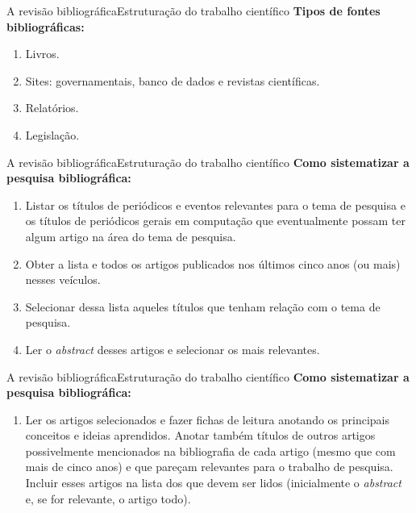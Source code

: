 \documentclass[t]{beamer}
\begin{document}

\begin{ftst}{A revisão bibliográfica}{Estruturação do trabalho científico}
\justifying
\textbf{Tipos de fontes bibliográficas:}
\vone
\begin{enumerate}
    \item Livros.
    \item Sites: governamentais, banco de dados e revistas científicas.
    \item Relatórios.
    \item Legislação.
\end{enumerate}


\end{ftst}


\begin{ftst}{A revisão bibliográfica}{Estruturação do trabalho científico}
\justifying
\textbf{Como sistematizar a pesquisa bibliográfica:}
\vone
\begin{enumerate}
    \item[a.] Listar os títulos de periódicos e eventos relevantes para o tema de pesquisa e os títulos de periódicos gerais em computação que eventualmente possam ter algum artigo na área do tema de pesquisa.
    \item[b.] Obter a lista e todos os artigos publicados nos últimos cinco anos (ou mais) nesses veículos.
    \item[c.] Selecionar dessa lista aqueles títulos que tenham relação com o tema de pesquisa.
    \item[d.] Ler o \textit{abstract} desses artigos e selecionar os mais relevantes.
\end{enumerate}


\end{ftst}


\begin{ftst}{A revisão bibliográfica}{Estruturação do trabalho científico}
\justifying
\textbf{Como sistematizar a pesquisa bibliográfica:}
\vone
\begin{enumerate}
    \item[e.] Ler os artigos selecionados e fazer fichas de leitura anotando os principais conceitos e ideias aprendidos. Anotar também títulos de outros artigos possivelmente mencionados na bibliografia de cada artigo (mesmo que com mais de cinco anos) e que pareçam relevantes para o trabalho de pesquisa. Incluir esses artigos na lista dos que devem ser lidos (inicialmente o \textit{abstract} e, se for relevante, o artigo todo).
\end{enumerate}


\end{ftst}
\end{document}
